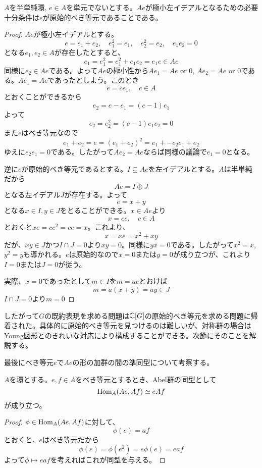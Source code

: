 \documentclass{ltjsreport}
\begin{document}
\begin{prop}
  $A$を半単純環, $e\in A$を単元でないとする。$Ae$が極小左イデアルとなるための必要十分条件は$e$が原始的べき等元であることである。
\end{prop}

\begin{proof}
  $Ae$が極小左イデアルとする。
  \[
    e=e_1+e_2,\quad e_1^2=e_1,\quad e_2^2=e_2,\quad e_1e_2=0
  \]
  となる$e_1,e_2\in A$が存在したとすると、
  \[
  e_1=e_1^2=e_1^2+e_1e_2=e_1e\in Ae  
  \]
  同様に$e_2\in Ae$である。よって$Ae$の極小性から$Ae_1=Ae\text{ or }0$, $Ae_2=Ae\text{ or }0$である。$Ae_1=Ae$であったとしよう。このとき
  \[
  e=ce_1,\quad c\in A  
  \]
  とおくことができるから
  \[
  e_2=e-e_1=(c-1)e_1
  \]
  よって
  \[
  e_2=e_2^2=(c-1)e_1e_2=0
  \]
  また$e$はべき等元なので
  \[
  e_1+e_2=e=(e_1+e_2)^2=e_1+-e_2e_1+e_2
  \]
  ゆえに$e_2e_1=0$である。したがって$Ae_2=Ae$ならば同様の議論で$e_1=0$となる。

  逆に$e$が原始的べき等元であるとする。$I\subsetneq Ae$を左イデアルとする。$A$は半単純だから
  \[
  Ae=I\oplus J  
  \]
  となる左イデアル$J$が存在する。よって
  \[
  e=x+y
  \]
  となる$x\in I, y\in J$をとることができる。$x\in Ae$より
  \[
  x=ce,\quad c\in A  
  \]
  とおくと$xe=ce^2=ce=x$。これより、
  \[
  x=xe=x^2+xy  
  \]
  だが、$xy\in J$かつ$I\cap J=0$より$xy=0$。同様に$yx=0$である。したがって$x^2=x$, $y^2=y$も導かれる。$e$は原始的なので$x=0$または$y=0$が成り立つが、これより$I=0$または$J=0$が従う。

  実際、$x=0$であったとして$m\in I$を$m=ae$とおけば
  \[
  m=a(x+y)=ay\in J  
  \]
  $I\cap J=0$より$m=0$
\end{proof}

したがって$G$の既約表現を求める問題は$\mathbb{C}[G]$の原始的べき等元を求める問題に帰着された。具体的に原始的べき等元を見つけるのは難しいが、対称群の場合はYoung図形とのきれいな対応により構成することができる。次節にそのことを解説する。

最後にべき等元$e$で$Ae$の形の加群の間の準同型について考察する。

\begin{prop}\label{hom_of_cyclic_module}
  $A$を環とする。$e,f\in A$をべき等元とするとき、Abel群の同型として
  \[
  \text{Hom}_A(Ae,Af)\simeq eAf
  \]
  が成り立つ。
\end{prop}

\begin{proof}
  $\phi\in\text{Hom}_A(Ae,Af)$に対して、
  \[
  \phi(e)=af  
  \]
  とおくと、$e$はべき等元だから
  \[
  \phi(e)=\phi(e^2)=e\phi(e)=eaf  
  \]
  よって$\phi\mapsto eaf$を考えればこれが同型を与える。
\end{proof}
\end{document}
